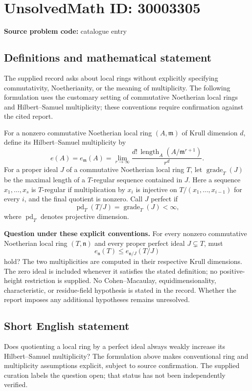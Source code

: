 \documentclass[11pt]{article}
\begin{document}
\section*{UnsolvedMath ID: 30003305}
\textbf{Source problem code:} catalogue entry
\subsection{Definitions and mathematical statement}
The supplied record asks about local rings without explicitly specifying commutativity, Noetherianity, or the meaning of multiplicity. The following formulation uses the customary setting of commutative Noetherian local rings and Hilbert--Samuel multiplicity; these conventions require confirmation against the cited report.

For a nonzero commutative Noetherian local ring \((A,\mathfrak m)\) of Krull dimension \(d\), define its Hilbert--Samuel multiplicity by
\[
e(A)=e_{\mathfrak m}(A)=\lim_{r\to\infty}\frac{d!\,\operatorname{length}_A(A/\mathfrak m^{r+1})}{r^d}.
\]
For a proper ideal \(J\) of a commutative Noetherian local ring \(T\), let \(\operatorname{grade}_T(J)\) be the maximal length of a \(T\)-regular sequence contained in \(J\). Here a sequence \(x_1,\ldots,x_s\) is \(T\)-regular if multiplication by \(x_i\) is injective on \(T/(x_1,\ldots,x_{i-1})\) for every \(i\), and the final quotient is nonzero. Call \(J\) perfect if
\[
\operatorname{pd}_T(T/J)=\operatorname{grade}_T(J)<\infty,
\]
where \(\operatorname{pd}_T\) denotes projective dimension.

\textbf{Question under these explicit conventions.} For every nonzero commutative Noetherian local ring \((T,\mathfrak n)\) and every proper perfect ideal \(J\subsetneq T\), must
\[
e_{\mathfrak n}(T)\leq e_{\mathfrak n/J}(T/J)
\]
hold? The two multiplicities are computed in their respective Krull dimensions. The zero ideal is included whenever it satisfies the stated definition; no positive-height restriction is supplied. No Cohen--Macaulay, equidimensionality, characteristic, or residue-field hypothesis is stated in the record. Whether the report imposes any additional hypotheses remains unresolved.
\subsection{Short English statement}
Does quotienting a local ring by a perfect ideal always weakly increase its Hilbert--Samuel multiplicity? The formulation above makes conventional ring and multiplicity assumptions explicit, subject to source confirmation. The supplied curation labels the question open; that status has not been independently verified.
\end{document}
